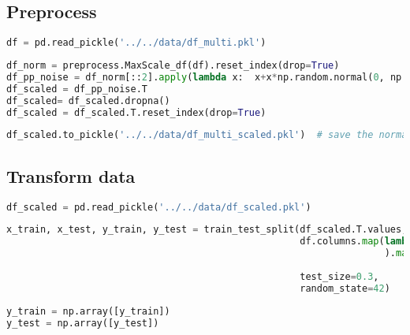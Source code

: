 \hypertarget{preprocess-3}{%
\subsection{Preprocess}\label{preprocess-3}}

\begin{lstlisting}[language=Python]
df = pd.read_pickle('../../data/df_multi.pkl')
\end{lstlisting}

\begin{lstlisting}[language=Python]
df_norm = preprocess.MaxScale_df(df).reset_index(drop=True)                                                    # each spectrum is scaled to 1
df_pp_noise = df_norm[::2].apply(lambda x:  x+x*np.random.normal(0, np.random.randint(1,3)*0.01 , len(x)))     # reduce size to 1024 and add noise
df_scaled = df_pp_noise.T
df_scaled= df_scaled.dropna()
df_scaled = df_scaled.T.reset_index(drop=True)
\end{lstlisting}

\begin{lstlisting}[language=Python]
df_scaled.to_pickle('../../data/df_multi_scaled.pkl')  # save the normalized, scaled df
\end{lstlisting}

\hypertarget{transform-data}{%
\subsection{Transform data}\label{transform-data}}

\begin{lstlisting}[language=Python]
df_scaled = pd.read_pickle('../../data/df_scaled.pkl')
\end{lstlisting}

\begin{lstlisting}[language=Python]
x_train, x_test, y_train, y_test = train_test_split(df_scaled.T.values,
                                                    df.columns.map(lambda x: x.split('_')[:-1]
                                                                   ).map(base.pair_list_to_tuples
                                                                         ).map(base.one_hot_encode_concentrations),
                                                    test_size=0.3,
                                                    random_state=42)
\end{lstlisting}

\begin{lstlisting}[language=Python]
y_train = np.array([y_train])
y_test = np.array([y_test])
\end{lstlisting}

